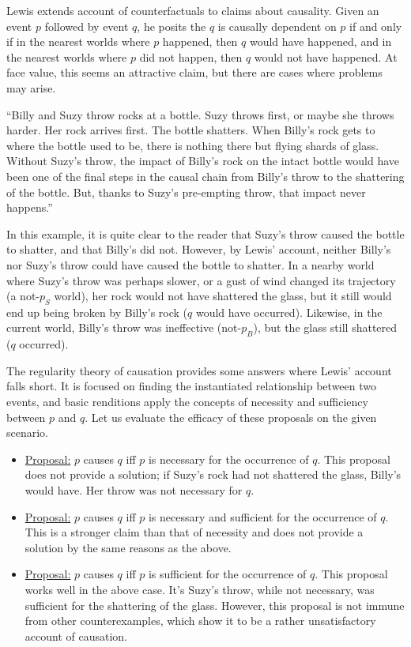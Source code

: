 \documentclass{article}
\begin{document}
Lewis extends account of counterfactuals to claims about causality. Given an event $p$ followed by event $q$, he posits the $q$ is causally dependent on $p$ if and only if in the nearest worlds where $p$ happened, then $q$ would have happened, and in the nearest worlds where $p$ did not happen, then $q$ would not have happened. At face value, this seems an attractive claim, but there are cases where problems may arise.

\begin{displayquote}
``Billy and Suzy throw rocks at a bottle. Suzy throws first, or maybe she throws harder. Her rock arrives first. The bottle shatters. When Billy's rock gets to where the bottle used to be, there is nothing there but flying shards of glass. Without Suzy's throw, the impact of Billy's rock on the intact bottle would have been one of the final steps in the causal chain from Billy's throw to the shattering of the bottle. But, thanks to Suzy's pre-empting throw, that impact never happens.''
\end{displayquote}

In this example, it is quite clear to the reader that Suzy's throw caused the bottle to shatter, and that Billy's did not. However, by Lewis' account, neither Billy's nor Suzy's throw could have caused the bottle to shatter. In a nearby world where Suzy's throw was perhaps slower, or a gust of wind changed its trajectory (a not-$p_S$ world), her rock would not have shattered the glass, but it still would end up being broken by Billy's rock ($q$ would have occurred). Likewise, in the current world, Billy's throw was ineffective (not-$p_B$), but the glass still shattered ($q$ occurred).

The regularity theory of causation provides some answers where Lewis' account falls short. It is focused on finding the instantiated relationship between two events, and basic renditions apply the concepts of necessity and sufficiency between $p$ and $q$. Let us evaluate the efficacy of these proposals on the given scenario.

    \begin{itemize}
    \item \underline{Proposal:} $p$ causes $q$ iff $p$ is necessary for the occurrence of $q$. \smallbreak
        This proposal does not provide a solution; if Suzy's rock had not shattered the glass, Billy's would have. Her throw was not necessary for $q$.
    \item \underline{Proposal:} $p$ causes $q$ iff $p$ is necessary and sufficient for the occurrence of $q$. \smallbreak
        This is a stronger claim than that of necessity and does not provide a solution by the same reasons as the above.
    \item \underline{Proposal:} $p$ causes $q$ iff $p$ is sufficient for the occurrence of $q$. \smallbreak
        This proposal works well in the above case. It's Suzy's throw, while not necessary, was sufficient for the shattering of the glass. However, this proposal is not immune from other counterexamples, which show it to be a rather unsatisfactory account of causation.
    \end{itemize}
\end{document}
